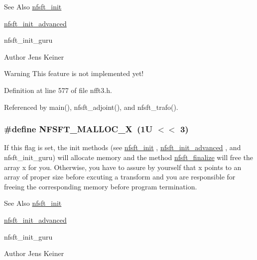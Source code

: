 \begin{DoxySeeAlso}{See Also}
\hyperlink{group__nfsft_ga65cda3f4a3edc5eb39c697cf34b1f0b9}{nfsft\-\_\-init} 

\hyperlink{group__nfsft_ga2812aa5beba0eb7efd3072bf323a0155}{nfsft\-\_\-init\-\_\-advanced} 

nfsft\-\_\-init\-\_\-guru 
\end{DoxySeeAlso}
\begin{DoxyAuthor}{Author}
Jens Keiner 
\end{DoxyAuthor}
\begin{DoxyWarning}{Warning}
This feature is not implemented yet! 
\end{DoxyWarning}


Definition at line 577 of file nfft3.\-h.



Referenced by main(), nfsft\-\_\-adjoint(), and nfsft\-\_\-trafo().

\hypertarget{group__nfsft_ga02e4313d15b24c79e6802f853d452454}{
\subsubsection[{N\-F\-S\-F\-T\-\_\-\-M\-A\-L\-L\-O\-C\-\_\-\-X}]{\setlength{\rightskip}{0pt plus 5cm}\#define N\-F\-S\-F\-T\-\_\-\-M\-A\-L\-L\-O\-C\-\_\-\-X~(1\-U $<$$<$ 3)}}\label{group__nfsft_ga02e4313d15b24c79e6802f853d452454}
If this flag is set, the init methods (see \hyperlink{group__nfsft_ga65cda3f4a3edc5eb39c697cf34b1f0b9}{nfsft\-\_\-init} , \hyperlink{group__nfsft_ga2812aa5beba0eb7efd3072bf323a0155}{nfsft\-\_\-init\-\_\-advanced} , and nfsft\-\_\-init\-\_\-guru) will allocate memory and the method \hyperlink{group__nfsft_gaa63e193a27d84059742ff25ff81e2ed1}{nfsft\-\_\-finalize} will free the array {\ttfamily x} for you. Otherwise, you have to assure by yourself that {\ttfamily x} points to an array of proper size before excuting a transform and you are responsible for freeing the corresponding memory before program termination.

\begin{DoxySeeAlso}{See Also}
\hyperlink{group__nfsft_ga65cda3f4a3edc5eb39c697cf34b1f0b9}{nfsft\-\_\-init} 

\hyperlink{group__nfsft_ga2812aa5beba0eb7efd3072bf323a0155}{nfsft\-\_\-init\-\_\-advanced} 

nfsft\-\_\-init\-\_\-guru 
\end{DoxySeeAlso}
\begin{DoxyAuthor}{Author}
Jens Keiner 
\end{DoxyAuthor}


